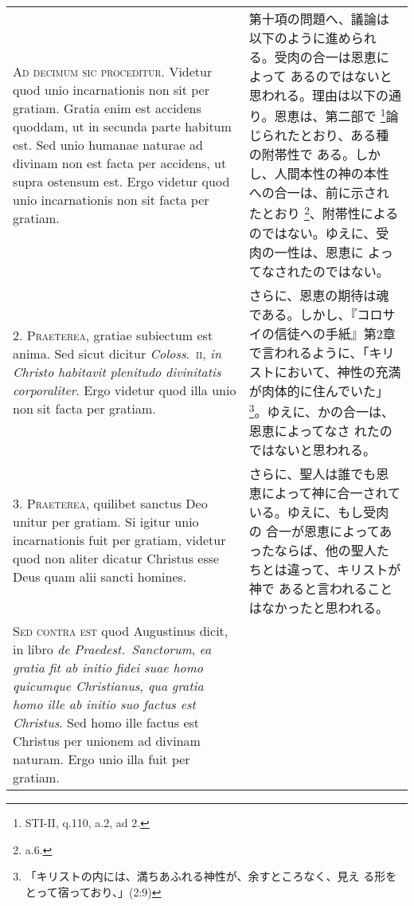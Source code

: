 \documentclass[10pt]{jsarticle} %
\begin{document}
\begin{longtable}{p{21em}p{21em}}

{\Huge A}{\scshape d decimum sic proceditur}. Videtur quod unio
incarnationis non sit per gratiam. Gratia enim est accidens quoddam,
ut in secunda parte habitum est. Sed unio humanae naturae ad divinam
non est facta per accidens, ut supra ostensum est. Ergo videtur quod
unio incarnationis non sit facta per gratiam.

&

第十項の問題へ、議論は以下のように進められる。受肉の合一は恩恵によって
あるのではないと思われる。理由は以下の通り。恩恵は、第二部で
\footnote{STI-II, q.110, a.2, ad 2.}論じられたとおり、ある種の附帯性で
ある。しかし、人間本性の神の本性への合一は、前に示されたとおり
\footnote{a.6.}、附帯性によるのではない。ゆえに、受肉の一性は、恩恵に
よってなされたのではない。

\\



2. {\scshape Praeterea}, gratiae subiectum est anima. Sed sicut
dicitur {\itshape Coloss}.~{\scshape ii}, {\itshape in Christo
habitavit plenitudo divinitatis corporaliter}. Ergo videtur quod illa
unio non sit facta per gratiam.

&

さらに、恩恵の期待は魂である。しかし、『コロサイの信徒への手紙』第2章
で言われるように、「キリストにおいて、神性の充満が肉体的に住んでいた」
\footnote{「キリストの内には、満ちあふれる神性が、余すところなく、見え
る形をとって宿っており、」(2:9)}。ゆえに、かの合一は、恩恵によってなさ
れたのではないと思われる。

\\



3. {\scshape Praeterea}, quilibet sanctus Deo unitur per gratiam. Si
igitur unio incarnationis fuit per gratiam, videtur quod non aliter
dicatur Christus esse Deus quam alii sancti homines.

&

さらに、聖人は誰でも恩恵によって神に合一されている。ゆえに、もし受肉の
合一が恩恵によってあったならば、他の聖人たちとは違って、キリストが神で
あると言われることはなかったと思われる。

\\



{\scshape Sed contra est} quod Augustinus dicit, in libro {\itshape de
Praedest.~Sanctorum}, {\itshape ea gratia fit ab initio fidei suae
homo quicumque Christianus, qua gratia homo ille ab initio suo factus
est Christus}. Sed homo ille factus est Christus per unionem ad
divinam naturam. Ergo unio illa fuit per gratiam.


\end{longtable}
\end{document}
